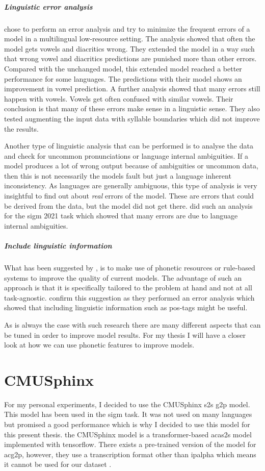 \subparagraph{Linguistic error analysis} \citet{lo-nicolai-2021-linguistic} chose to perform an error analysis and try to minimize the frequent errors of a model in a multilingual low-resource setting. The analysis showed that often the model gets vowels and diacritics wrong. They extended the model in a way such that wrong vowel and diacritics predictions are punished more than other errors. Compared with the unchanged model, this extended model reached a better performance for some languages. The predictions with their model shows an improvement in vowel prediction. A further analysis showed that many errors still happen with vowels. Vowels get often confused with similar vowels. Their conclusion is that many of these errors make sense in a linguistic sense. They also tested augmenting the input data with syllable boundaries which did not improve the results. 

Another type of linguistic analysis that can be performed is to analyse the data and check for uncommon pronunciations or language internal ambiguities. If a model produces a lot of wrong output because of ambiguities or uncommon data, then this is not necessarily the models fault but just a language inherent inconsistency. As languages are generally ambiguous, this type of analysis is very insightful to find out about \textit{real} errors of the model. These are errors that could be derived from the data, but the model did not get there. \cite{Ashby&Bartley.2021} did such an analysis for the \ac{sigm} 2021 task which showed that many errors are due to language internal ambiguities.


\subparagraph{Include linguistic information} What has been suggested by \cite{gorman-etal-2020-sigmorphon}, is to make use of phonetic resources or rule-based systems to improve the quality of current models. The advantage of such an approach is that it is specifically tailored to the problem at hand and not at all task-agnostic. \cite{makarov-clematide-2020-cluzh} confirm this suggestion as they performed an error analysis which showed that including linguistic information such as \ac{pos}-tags might be useful. 

As is always the case with such research there are many different aspects that can be tuned in order to improve model results. For my thesis I will have a closer look at how we can use phonetic features to improve models. 


\section{CMUSphinx}
\label{sec:cmu}
For my personal experiments, I decided to use the CMUSphinx \ac{s2s} \ac{g2p} model. This model has been used in the \ac{sigm} task. It was not used on many languages but promised a good performance which is why I decided to use this model for this present thesis. the CMUSphinx model is a transformer-based ac{as2s} model implemented with tensorflow. There exists a pre-trained version of the model for ac{g2p}, however, they use a transcription format other than \ac{ipalpha} which means it cannot be used for our dataset \citep{GitHub.03.02.2022}. 


